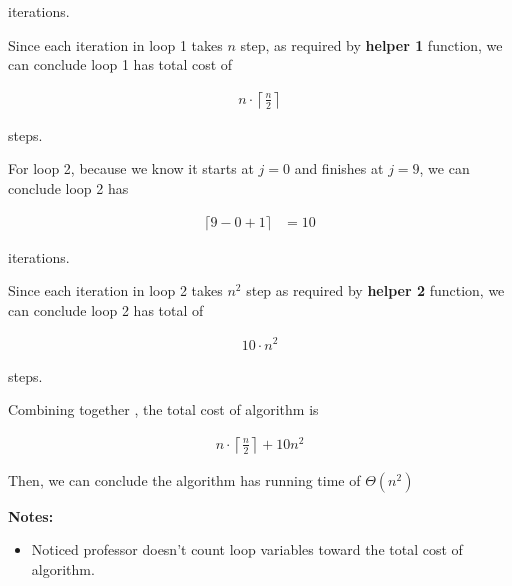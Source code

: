 \documentclass[12pt]{article}
\begin{document}
\begin{enumerate}[a.]
\begin{mdframed}
        iterations.

        \bigskip

        Since each iteration in loop 1 takes $n$ step, as required by \textbf{helper 1} function,
        we can conclude loop 1 has total cost of

        \begin{align}
            n \cdot \left\lceil \frac{n}{2} \right\rceil
        \end{align}

        steps.

        \bigskip

        For loop 2, because we know it starts at $j = 0$ and finishes at $j = 9$,
        we can conclude loop 2 has

        \begin{align}
            \lceil 9 - 0 + 1 \rceil &= 10
        \end{align}

        iterations.

        \bigskip

        Since each iteration in loop 2 takes $n^2$ step as required by \textbf{helper 2} function,
        we can conclude loop 2 has total of

        \begin{align}
            10 \cdot n^2
        \end{align}

        steps.

        \bigskip

        \color{red} Combining together \color{black}, the total cost of algorithm
        is

        \begin{align}
            n \cdot \left\lceil \frac{n}{2} \right\rceil + 10n^2
        \end{align}

        \bigskip

        Then, we can conclude the algorithm has running time of $\Theta(n^2)$
        \color{black}

    \end{mdframed}

    \textbf{Notes:}

    \begin{itemize}
        \item Noticed professor doesn't count loop variables toward the total
        cost of algorithm.

        \bigskip


\end{itemize}
\end{enumerate}
\end{document}
